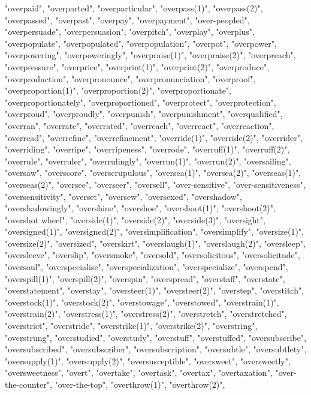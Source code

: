 "overpaid",
"overparted",
"overparticular",
"overpass(1)",
"overpass(2)",
"overpassed",
"overpast",
"overpay",
"overpayment",
"over-peopled",
"overpersuade",
"overpersuasion",
"overpitch",
"overplay",
"overplus",
"overpopulate",
"overpopulated",
"overpopulation",
"overpot",
"overpower",
"overpowering",
"overpoweringly",
"overpraise(1)",
"overpraise(2)",
"overpreach",
"overpressure",
"overprice",
"overprint(1)",
"overprint(2)",
"overproduce",
"overproduction",
"overpronounce",
"overpronunciation",
"overproof",
"overproportion(1)",
"overproportion(2)",
"overproportionate",
"overproportionately",
"overproportioned",
"overprotect",
"overprotection",
"overproud",
"overproudly",
"overpunish",
"overpunishment",
"overqualified",
"overran",
"overrate",
"overrated",
"overreach",
"overreact",
"overreaction",
"overread",
"overrefine",
"overrefinement",
"override(1)",
"override(2)",
"overrider",
"overriding",
"overripe",
"overripeness",
"overrode",
"overruff(1)",
"overruff(2)",
"overrule",
"overruler",
"overrulingly",
"overrun(1)",
"overrun(2)",
"oversailing",
"oversaw",
"overscore",
"overscrupulous",
"oversea(1)",
"oversea(2)",
"overseas(1)",
"overseas(2)",
"oversee",
"overseer",
"oversell",
"over-sensitive",
"over-sensitiveness",
"oversensitivity",
"overset",
"oversew",
"oversexed",
"overshadow",
"overshadowingly",
"overshine",
"overshoe",
"overshoot(1)",
"overshoot(2)",
"overshot wheel",
"overside(1)",
"overside(2)",
"overside(3)",
"oversight",
"oversigned(1)",
"oversigned(2)",
"oversimplification",
"oversimplify",
"oversize(1)",
"oversize(2)",
"oversized",
"overskirt",
"overslaugh(1)",
"overslaugh(2)",
"oversleep",
"oversleeve",
"overslip",
"oversmoke",
"oversold",
"oversolicitous",
"oversolicitude",
"oversoul",
"overspecialise",
"overspecialization",
"overspecialize",
"overspend",
"overspill(1)",
"overspill(2)",
"overspin",
"overspread",
"overstaff",
"overstate",
"overstatement",
"overstay",
"oversteer(1)",
"oversteer(2)",
"overstep",
"overstitch",
"overstock(1)",
"overstock(2)",
"overstowage",
"overstowed",
"overstrain(1)",
"overstrain(2)",
"overstress(1)",
"overstress(2)",
"overstretch",
"overstretched",
"overstrict",
"overstride",
"overstrike(1)",
"overstrike(2)",
"overstring",
"overstrung",
"overstudied",
"overstudy",
"overstuff",
"overstuffed",
"oversubscribe",
"oversubscribed",
"oversubscriber",
"oversubscription",
"oversubtle",
"oversubtlety",
"oversupply(1)",
"oversupply(2)",
"oversusceptible",
"oversweet",
"oversweetly",
"oversweetness",
"overt",
"overtake",
"overtask",
"overtax",
"overtaxation",
"over-the-counter",
"over-the-top",
"overthrow(1)",
"overthrow(2)",
